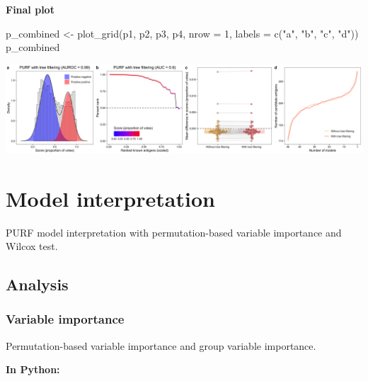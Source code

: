 \documentclass[
  11pt,
  oneside]{book}
\newenvironment{Shaded}{\begin{snugshade}}{\end{snugshade}}
\newcommand{\AttributeTok}[1]{\textcolor[rgb]{0.77,0.63,0.00}{#1}}
\newcommand{\DecValTok}[1]{\textcolor[rgb]{0.00,0.00,0.81}{#1}}
\newcommand{\FunctionTok}[1]{\textcolor[rgb]{0.00,0.00,0.00}{#1}}
\newcommand{\NormalTok}[1]{#1}
\newcommand{\OtherTok}[1]{\textcolor[rgb]{0.56,0.35,0.01}{#1}}
\newcommand{\StringTok}[1]{\textcolor[rgb]{0.31,0.60,0.02}{#1}}
\begin{document}
\textbf{Final plot}

\begin{Shaded}
\begin{Highlighting}[]
\NormalTok{p\_combined }\OtherTok{\textless{}{-}} \FunctionTok{plot\_grid}\NormalTok{(p1, p2, p3, p4, }\AttributeTok{nrow =} \DecValTok{1}\NormalTok{, }\AttributeTok{labels =} \FunctionTok{c}\NormalTok{(}\StringTok{"a"}\NormalTok{, }\StringTok{"b"}\NormalTok{, }\StringTok{"c"}\NormalTok{, }\StringTok{"d"}\NormalTok{))}
\NormalTok{p\_combined}
\end{Highlighting}
\end{Shaded}

\begin{center}\includegraphics[width=1\linewidth]{./figures/Fig 2} \end{center}

\hypertarget{model-interpretation}{%
\section{Model interpretation}\label{model-interpretation}}

PURF model interpretation with permutation-based variable importance and Wilcox test.

\hypertarget{analysis-4}{%
\subsection{Analysis}\label{analysis-4}}

\hypertarget{variable-importance}{%
\subsubsection{Variable importance}\label{variable-importance}}

Permutation-based variable importance and group variable importance.

\textbf{In Python: }
\end{document}
